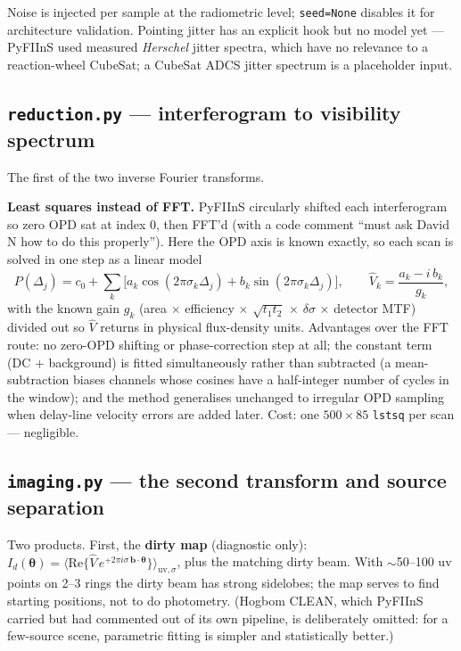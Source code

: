 \documentclass[11pt]{article}
\newcommand{\code}[1]{\texttt{\small #1}}
\newcommand{\file}[1]{\textcolor{plumdark}{\texttt{\small #1}}}
\begin{document}
Noise is injected per sample at the radiometric level; \code{seed=None}
disables it for architecture validation. Pointing jitter has an explicit
hook but no model yet --- PyFIInS used measured \emph{Herschel} jitter
spectra, which have no relevance to a reaction-wheel CubeSat; a CubeSat ADCS
jitter spectrum is a placeholder input.

\subsection{\file{reduction.py} --- interferogram to visibility spectrum}

The first of the two inverse Fourier transforms.

\begin{decisionbox}
\textbf{Least squares instead of FFT.} PyFIInS circularly shifted each
interferogram so zero OPD sat at index 0, then FFT'd (with a code comment
``must ask David N how to do this properly''). Here the OPD axis is known
exactly, so each scan is solved in one step as a linear model
\begin{equation}
P(\Delta_j) = c_0 + \sum_k \big[a_k \cos(2\pi\sigma_k\Delta_j)
 + b_k \sin(2\pi\sigma_k\Delta_j)\big],
\qquad \hat V_k = \frac{a_k - i\,b_k}{g_k},
\end{equation}
with the known gain $g_k$ (area $\times$ efficiency $\times$
$\sqrt{t_1t_2}$ $\times$ $\delta\sigma$ $\times$ detector MTF) divided out so
$\hat V$ returns in physical flux-density units. Advantages over the FFT
route: no zero-OPD shifting or phase-correction step at all; the constant
term (DC + background) is fitted simultaneously rather than subtracted (a
mean-subtraction biases channels whose cosines have a half-integer number of
cycles in the window); and the method generalises unchanged to irregular OPD
sampling when delay-line velocity errors are added later. Cost: one
$500\times 85$ \code{lstsq} per scan --- negligible.
\end{decisionbox}

\subsection{\file{imaging.py} --- the second transform and source separation}

Two products. First, the \textbf{dirty map} (diagnostic only):
$I_d(\boldsymbol\theta) = \langle \mathrm{Re}\{\hat V\,
e^{+2\pi i\sigma\,\mathbf b\cdot\boldsymbol\theta}\}\rangle_{\mathrm{uv},\sigma}$,
plus the matching dirty beam. With $\sim$50--100 uv points on 2--3 rings the
dirty beam has strong sidelobes; the map serves to find starting positions,
not to do photometry. (Hogbom CLEAN, which PyFIInS carried but had commented
out of its own pipeline, is deliberately omitted: for a few-source scene,
parametric fitting is simpler and statistically better.)
\end{document}
